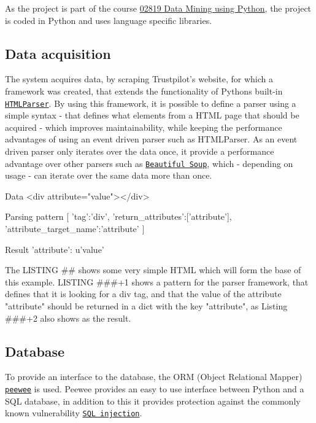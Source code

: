 \documentclass[10pt]{IEEEtran}
\begin{document}
As the project is part of the course \href{http://www.kurser.dtu.dk/02819.aspx?menulanguage=en-GB}{02819 Data Mining using Python}, the project is coded in Python and uses language specific libraries.

\subsection{Data acquisition}
The system acquires data, by scraping Trustpilot's website, for which a framework was created, that extends the functionality of Pythons built-in \href{http://docs.python.org/2/library/htmlparser.html}{\texttt{HTMLParser}}. By using this framework, it is possible to define a parser using a simple syntax - that defines what elements from a HTML page that should be acquired - which improves maintainability, while keeping the performance advantages of using an event driven parser such as HTMLParser. As an event driven parser only iterates over the data once, it provide a performance advantage over other parsers such as \href{http://www.crummy.com/software/BeautifulSoup/}{\texttt{Beautiful Soup}}, which - depending on usage - can iterate over the same data more than once.

Data
<div attribute="value"></div>

Parsing pattern
[{
    'tag':'div',
    'return_attributes':['attribute'],
    'attribute_target_name':'attribute'
 }]

Result
{'attribute': u'value'}


The LISTING ## shows some very simple HTML which will form the base of this example. LISTING ###+1 shows a pattern for the parser framework, that defines that it is looking for a div tag, and that the value of the attribute "attribute" should be returned in a dict with the key "attribute", as Listing ###+2 also shows as the result.

\subsection{Database}
To provide an interface to the database, the ORM (Object Relational Mapper) \href{http://peewee.readthedocs.org/en/latest/}{\texttt{peewee}} is used. Peewee provides an easy to use interface between Python and a SQL database, in addition to this it provides protection against the commonly known vulnerability \href{https://www.owasp.org/index.php/Top_10_2013-A1-Injection}{\texttt{SQL injection}}.
\end{document}
